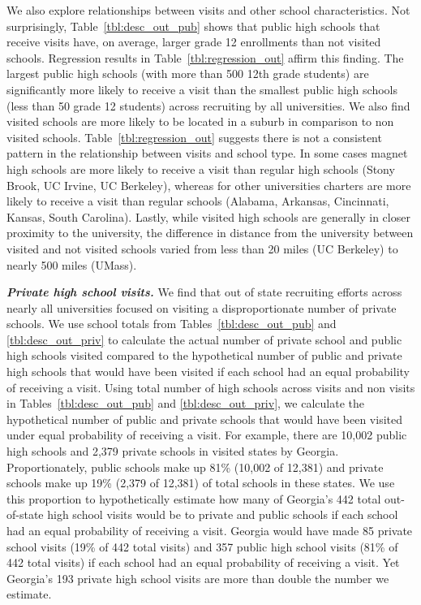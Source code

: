 \documentclass[twoside]{article}
\begin{document}
We also explore relationships between visits and other school characteristics. Not surprisingly, Table~\ref{tbl:desc_out_pub} shows that public high schools that receive visits have, on average, larger grade 12 enrollments than not visited schools. Regression results in Table~\ref{tbl:regression_out} affirm this finding. The largest public high schools (with more than 500 12th grade students) are significantly more likely to receive a visit than the smallest public high schools (less than 50 grade 12 students) across recruiting by all universities.  We also find visited schools are more likely to be located in a suburb in comparison to non visited schools. Table~\ref{tbl:regression_out} suggests there is not a consistent pattern in the relationship between visits and school type. In some cases magnet high schools are more likely to receive a visit than regular high schools (Stony Brook, UC Irvine, UC Berkeley), whereas for other universities charters are more likely to receive a visit than regular schools (Alabama, Arkansas, Cincinnati, Kansas, South Carolina). Lastly, while visited high schools are generally in closer proximity to the university, the difference in distance from the university between visited and not visited schools varied from less than 20 miles (UC Berkeley) to nearly 500 miles (UMass).

\textbf{\textit{Private high school visits.}} We find that out of state recruiting efforts across nearly all universities focused on visiting a disproportionate number of private schools. We use school totals from Tables~\ref{tbl:desc_out_pub} and \ref{tbl:desc_out_priv} to calculate the actual number of private school and public high schools visited compared to the hypothetical number of public and private high schools that would have been visited if each school had an equal probability of receiving a visit. Using total number of high schools across visits and non visits in Tables~\ref{tbl:desc_out_pub} and \ref{tbl:desc_out_priv}, we calculate the hypothetical number of public and private schools that would have been visited under equal probability of receiving a visit. For example, there are 10,002 public high schools and 2,379 private schools in visited states by Georgia. Proportionately, public schools  make up 81\% (10,002 of 12,381) and private schools make up 19\% (2,379 of 12,381) of total schools in these states. We use this proportion to hypothetically estimate how many of Georgia's 442 total out-of-state high school visits would be to private and public schools if each school had an equal probability of receiving a visit. Georgia would have made 85 private school visits (19\% of 442 total visits) and 357 public high school visits (81\% of 442 total visits) if each school had an equal probability of receiving a visit. Yet Georgia’s 193 private high school visits are more than double the number we estimate.
\end{document}
